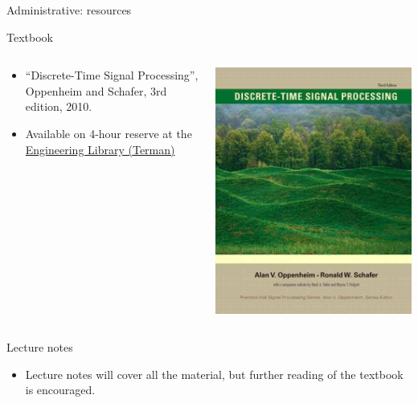 \documentclass[10pt, handout]{beamer}
\begin{document}
%
\begin{frame}{Administrative: resources}
\begin{block}{Textbook}
\begin{columns}[t]
	\begin{column}{0.8\textwidth}
		\begin{itemize}
			\item ``Discrete-Time Signal Processing'', Oppenheim and Schafer, 3rd edition, 2010.
			\item Available on 4-hour reserve at the \href{https://campus-map.stanford.edu/?id=04-080&lat=37.42787956&lng=-122.17429865&zoom=17&srch=engineeri}{Engineering Library (Terman)}
		\end{itemize}
	\end{column}
	\begin{column}{0.25\textwidth}  %
		\vspace{-1cm}
		\begin{center}
			\includegraphics[width=\textwidth]{figs/book_cover.jpg}
		\end{center}
	\end{column}
\end{columns}
\end{block}
\vspace{-0.5cm}
\begin{block}{Lecture notes}
	\begin{itemize}
		\item Lecture notes will cover all the material, but further reading of the textbook is encouraged.
	\end{itemize}
\end{block}


\end{frame}
\end{document}
